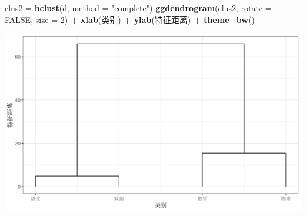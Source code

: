 \documentclass[
]{article}
\newenvironment{Shaded}{\begin{snugshade}}{\end{snugshade}}
\newcommand{\AttributeTok}[1]{\textcolor[rgb]{0.13,0.29,0.53}{#1}}
\newcommand{\ConstantTok}[1]{\textcolor[rgb]{0.56,0.35,0.01}{#1}}
\newcommand{\DecValTok}[1]{\textcolor[rgb]{0.00,0.00,0.81}{#1}}
\newcommand{\FunctionTok}[1]{\textcolor[rgb]{0.13,0.29,0.53}{\textbf{#1}}}
\newcommand{\NormalTok}[1]{#1}
\newcommand{\OtherTok}[1]{\textcolor[rgb]{0.56,0.35,0.01}{#1}}
\newcommand{\SpecialCharTok}[1]{\textcolor[rgb]{0.81,0.36,0.00}{\textbf{#1}}}
\newcommand{\StringTok}[1]{\textcolor[rgb]{0.31,0.60,0.02}{#1}}
\begin{document}
\begin{Shaded}
\begin{Highlighting}[]
\NormalTok{clus2 }\OtherTok{=} \FunctionTok{hclust}\NormalTok{(d, }\AttributeTok{method =} \StringTok{"complete"}\NormalTok{)}
\FunctionTok{ggdendrogram}\NormalTok{(clus2, }\AttributeTok{rotate =} \ConstantTok{FALSE}\NormalTok{, }\AttributeTok{size =} \DecValTok{2}\NormalTok{) }\SpecialCharTok{+}
  \FunctionTok{xlab}\NormalTok{(}\StringTok{\textquotesingle{}类别\textquotesingle{}}\NormalTok{) }\SpecialCharTok{+}
  \FunctionTok{ylab}\NormalTok{(}\StringTok{\textquotesingle{}特征距离\textquotesingle{}}\NormalTok{) }\SpecialCharTok{+}
  \FunctionTok{theme\_bw}\NormalTok{()}
\end{Highlighting}
\end{Shaded}

\begin{center}\includegraphics[width=1\linewidth,height=1\textheight]{../picture/rmd/exp7/unnamed-chunk-3-1.png} \end{center}
\end{document}
